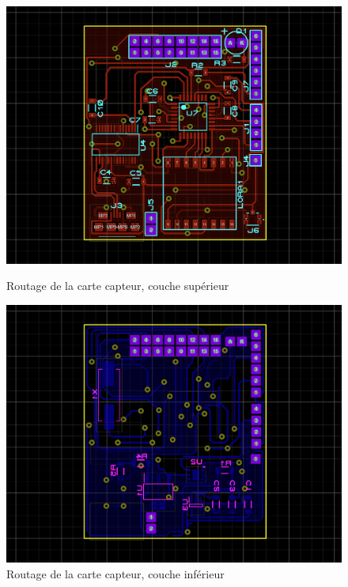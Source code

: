         \begin{figure}[!h]
            \centering
            \begin{minipage}{.48\linewidth}
                \begin{center}
                    \includegraphics[width=1\textwidth]{img/proteus/routage_top.png}
                    \caption{\label{fig:routage_top}Routage de la carte capteur, couche supérieur}  
                \end{center}
            \end{minipage}\hfill
            \begin{minipage}{.48\linewidth}
                \begin{center}
                    \begin{center}
                        \includegraphics[width=1\textwidth]{img/proteus/routage_bottom.png}
                        \caption{\label{fig:routage_bottom}Routage de la carte capteur, couche inférieur}  
                    \end{center}
                \end{center}
            \end{minipage}
        \end{figure}

